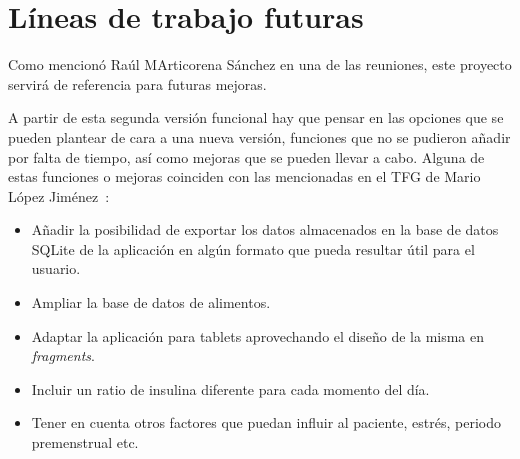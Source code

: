 \section{Líneas de trabajo futuras}
Como mencionó Raúl MArticorena Sánchez en una de las reuniones, este proyecto servirá de referencia para futuras mejoras.

A partir de esta segunda versión funcional hay que pensar en las opciones que se pueden plantear de cara a una nueva versión, funciones que no se pudieron añadir por falta de tiempo, así como mejoras que se pueden llevar a cabo. Alguna de estas funciones o mejoras coinciden con las mencionadas en el TFG de Mario López Jiménez~\cite{mario2016}:
\begin{itemize}
	\item Añadir la posibilidad de exportar los datos almacenados en la base de datos SQLite de la aplicación en algún formato que pueda resultar útil para el usuario.
	\item Ampliar la base de datos de alimentos.
	\item Adaptar la aplicación para tablets aprovechando el diseño de la misma en \textit{fragments}.
	\item Incluir un ratio de insulina diferente para cada momento del día.
	\item Tener en cuenta otros factores que puedan influir al paciente, estrés, periodo premenstrual etc. 
	
\end{itemize}
